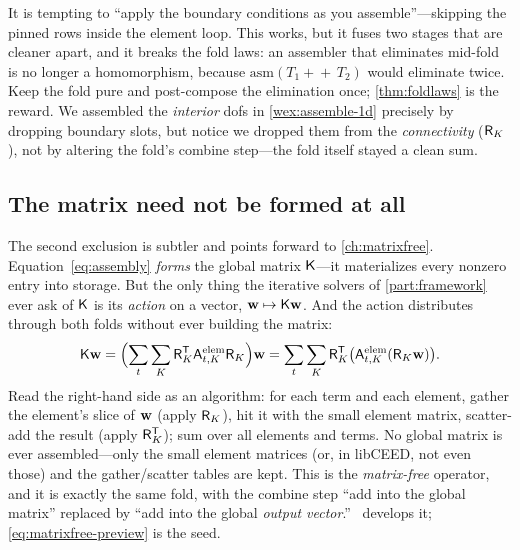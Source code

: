 \begin{pitfall}
It is tempting to ``apply the boundary conditions as you assemble''---skipping the
pinned rows inside the element loop. This works, but it fuses two stages that are
cleaner apart, and it breaks the fold laws: an assembler that eliminates
mid-fold is no longer a homomorphism, because $\mathrm{asm}(T_1\!+\!\!+\,T_2)$
would eliminate twice. Keep the fold pure and post-compose the elimination once;
\cref{thm:foldlaws} is the reward. We assembled the \emph{interior} dofs in
\cref{wex:assemble-1d} precisely by dropping boundary slots, but notice we dropped
them from the \emph{connectivity} ($\mathsf{R}_K$), not by altering the fold's combine
step---the fold itself stayed a clean sum.
\end{pitfall}

\subsection{The matrix need not be formed at all}

The second exclusion is subtler and points forward to \cref{ch:matrixfree}.
Equation~\cref{eq:assembly} \emph{forms} the global matrix $\mathsf{K}$---it
materializes every nonzero entry into storage. But the only thing the iterative
solvers of \cref{part:framework} ever ask of $\mathsf{K}$ is its \emph{action} on a
vector, $\mathbf{w}\mapsto\mathsf{K}\mathbf{w}$. And the action distributes through both folds
without ever building the matrix:
\begin{equation}
\mathsf{K}\mathbf{w}=\Bigl(\sum_t\sum_{K}\mathsf{R}_K^{\mathsf T}\mathsf{A}^{\mathrm{elem}}_{t,K}\mathsf{R}_K\Bigr)\mathbf{w}
=\sum_t\sum_{K}\mathsf{R}_K^{\mathsf T}\bigl(\mathsf{A}^{\mathrm{elem}}_{t,K}(\mathsf{R}_K\mathbf{w})\bigr).
\label{eq:matrixfree-preview}
\end{equation}
Read the right-hand side as an algorithm: for each term and each element, gather
the element's slice of $\mathbf{w}$ (apply $\mathsf{R}_K$), hit it with the small element
matrix, scatter-add the result (apply $\mathsf{R}_K^{\mathsf T}$); sum over all
elements and terms. No global matrix is ever assembled---only the small element
matrices (or, in libCEED, not even those) and the gather/scatter tables are kept.
This is the \emph{matrix-free} operator, and it is exactly the same fold, with the
combine step ``add into the global matrix'' replaced by ``add into the global
\emph{output vector}.''~ develops it; \cref{eq:matrixfree-preview}
is the seed.

